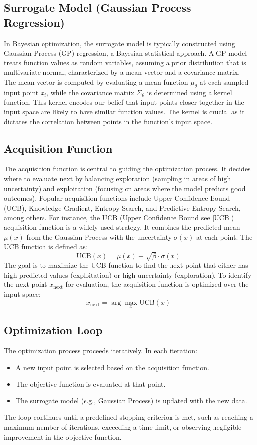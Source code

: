 \subsection{Surrogate Model (Gaussian Process Regression)}
In Bayesian optimization, the surrogate model is typically constructed using Gaussian Process (GP) regression, a Bayesian 
statistical approach. A GP model treats function values as random variables, assuming a prior distribution that is 
multivariate normal, characterized by a mean vector and a covariance matrix. The mean vector is computed by evaluating a mean 
function $\mu_\theta$ at each sampled input point $x_i$, while the covariance matrix $\Sigma_\theta$ is determined using a 
kernel function. This kernel encodes our belief that input points closer together in the input space are likely to have 
similar function values. The kernel is crucial as it dictates the correlation between points in the function's input space.

\subsection{Acquisition Function}
The acquisition function is central to guiding the optimization process. It decides where to evaluate next by balancing 
exploration (sampling in areas of high uncertainty) and exploitation (focusing on areas where the model predicts good 
outcomes). Popular acquisition functions include Upper Confidence Bound (UCB), Knowledge Gradient, Entropy Search, and 
Predictive Entropy Search, among others.\newline 
For instance, the UCB (Upper Confidence Bound see \ref{UCB}) acquisition function is a widely used strategy. 
It combines the predicted mean $\mu(x)$ from the Gaussian Process with the uncertainty $\sigma(x)$ at each point. The UCB 
function is defined as:
$$\text{UCB}(x) = \mu(x) + \sqrt{\beta} \cdot \sigma(x)$$
The goal is to maximize the UCB function to find the next point that either has high predicted values (exploitation) or high 
uncertainty (exploration). To identify the next point $x_\text{next}$ for evaluation, the acquisition function is optimized 
over the input space:
$$x_{\text{next}} = \arg \max_x \text{UCB}(x)$$

\subsection{Optimization Loop}
The optimization process proceeds iteratively. In each iteration:
\begin{itemize}
\item A new input point is selected based on the acquisition function.
\item The objective function is evaluated at that point.
\item The surrogate model (e.g., Gaussian Process) is updated with the new data.
\end{itemize}
The loop continues until a predefined stopping criterion is met, such as reaching a maximum number of iterations, 
exceeding a time limit, or observing negligible improvement in the objective function.

